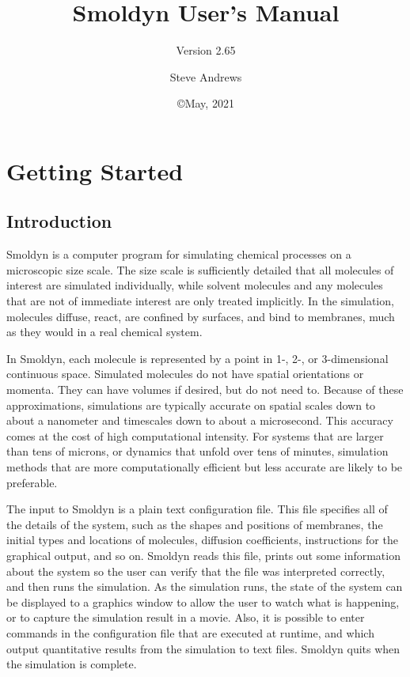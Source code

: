 \documentclass {scrbook}
\begin{document}


\title{Smoldyn User's Manual}
\subtitle{Version 2.65}
\date{\copyright May, 2021}
\author{Steve Andrews}
\maketitle

\tableofcontents


\part{Getting Started}

\chapter{Introduction}

Smoldyn is a computer program for simulating chemical processes on a microscopic size scale. The size scale is sufficiently detailed that all molecules of interest are simulated individually, while solvent molecules and any molecules that are not of immediate interest are only treated implicitly. In the simulation, molecules diffuse, react, are confined by surfaces, and bind to membranes, much as they would in a real chemical system.

In Smoldyn, each molecule is represented by a point in 1-, 2-, or 3-dimensional continuous space. Simulated molecules do not have spatial orientations or momenta. They can have volumes if desired, but do not need to. Because of these approximations, simulations are typically accurate on spatial scales down to about a nanometer and timescales down to about a microsecond. This accuracy comes at the cost of high computational intensity. For systems that are larger than tens of microns, or dynamics that unfold over tens of minutes, simulation methods that are more computationally efficient but less accurate are likely to be preferable.

The input to Smoldyn is a plain text configuration file. This file specifies all of the details of the system, such as the shapes and positions of membranes, the initial types and locations of molecules, diffusion coefficients, instructions for the graphical output, and so on. Smoldyn reads this file, prints out some information about the system so the user can verify that the file was interpreted correctly, and then runs the simulation. As the simulation runs, the state of the system can be displayed to a graphics window to allow the user to watch what is happening, or to capture the simulation result in a movie. Also, it is possible to enter commands in the configuration file that are executed at runtime, and which output quantitative results from the simulation to text files. Smoldyn quits when the simulation is complete.
\end{document}
